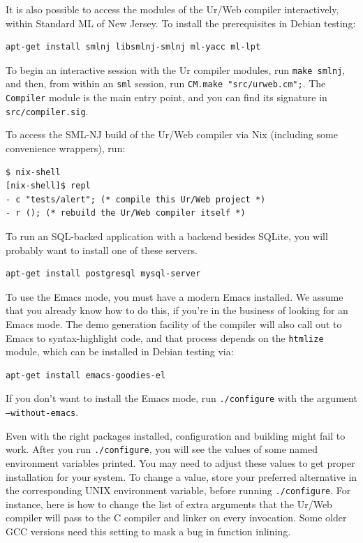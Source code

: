 \documentclass{article}
\begin{document}
It is also possible to access the modules of the Ur/Web compiler interactively, within Standard ML of New Jersey.  To install the prerequisites in Debian testing:
\begin{verbatim}
apt-get install smlnj libsmlnj-smlnj ml-yacc ml-lpt
\end{verbatim}

To begin an interactive session with the Ur compiler modules, run \texttt{make smlnj}, and then, from within an \texttt{sml} session, run \texttt{CM.make "src/urweb.cm";}.  The \texttt{Compiler} module is the main entry point, and you can find its signature in \texttt{src/compiler.sig}.

To access the SML-NJ build of the Ur/Web compiler via Nix (including some convenience wrappers), run:
\begin{verbatim}
$ nix-shell
[nix-shell]$ repl
- c "tests/alert"; (* compile this Ur/Web project *)
- r (); (* rebuild the Ur/Web compiler itself *)
\end{verbatim}

To run an SQL-backed application with a backend besides SQLite, you will probably want to install one of these servers.

\begin{verbatim}
apt-get install postgresql mysql-server
\end{verbatim}

To use the Emacs mode, you must have a modern Emacs installed.  We assume that you already know how to do this, if you're in the business of looking for an Emacs mode.  The demo generation facility of the compiler will also call out to Emacs to syntax-highlight code, and that process depends on the \texttt{htmlize} module, which can be installed in Debian testing via:

\begin{verbatim}
apt-get install emacs-goodies-el
\end{verbatim}

If you don't want to install the Emacs mode, run \texttt{./configure} with the argument \texttt{--without-emacs}.

Even with the right packages installed, configuration and building might fail to work.  After you run \texttt{./configure}, you will see the values of some named environment variables printed.  You may need to adjust these values to get proper installation for your system.  To change a value, store your preferred alternative in the corresponding UNIX environment variable, before running \texttt{./configure}.  For instance, here is how to change the list of extra arguments that the Ur/Web compiler will pass to the C compiler and linker on every invocation.  Some older GCC versions need this setting to mask a bug in function inlining.
\end{document}

